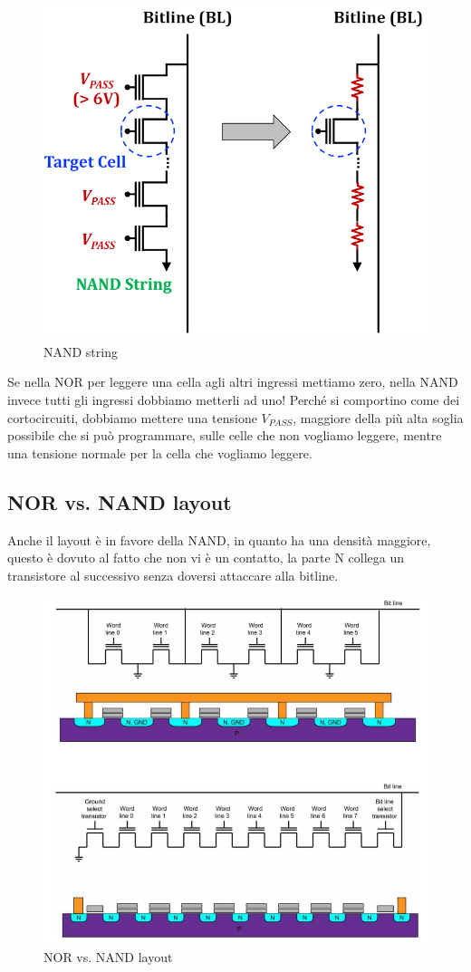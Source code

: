 \newpage

\begin{figure}[htbp]
    \centering
    \includegraphics[width=0.5\linewidth]{img/mhgj.png}
    \caption{NAND string}
\end{figure}

Se nella NOR per leggere una cella agli altri ingressi mettiamo zero, nella NAND invece tutti gli ingressi dobbiamo metterli ad uno! Perché si comportino come dei cortocircuiti, dobbiamo mettere una tensione $V_{PASS}$, maggiore della più alta soglia possibile che si può programmare,  sulle celle che non vogliamo leggere, mentre una tensione normale per la cella che vogliamo leggere.

\subsection{NOR vs. NAND layout}

Anche il layout è in favore della NAND, in quanto ha una densità maggiore, questo è dovuto al fatto che non vi è un contatto, la parte N collega un transistore al successivo senza doversi attaccare alla bitline.

\begin{figure}[htbp]
    \centering
    \includegraphics[width=0.5\linewidth]{img/ahnertd.png}
    \caption{NOR vs. NAND layout}
\end{figure}


